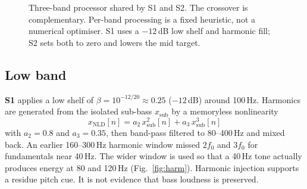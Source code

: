 \documentclass[12pt,journal,onecolumn]{IEEEtran}
\begin{document}
\begin{figure}[!htbp]
\centering
{}
\caption{Three-band processor shared by S1 and S2. The crossover is complementary. Per-band processing is a fixed heuristic, not a numerical optimiser. S1 uses a $-12$\,dB low shelf and harmonic fill; S2 sets both to zero and lowers the mid target.}
\label{fig:block}
\end{figure}

\subsection{Low band}

\textbf{S1} applies a low shelf of $\beta = 10^{-12/20} \approx 0.25$ ($-12$\,dB) around 100\,Hz. Harmonics are generated from the isolated sub-bass $x_{\mathrm{sub}}$ by a memoryless nonlinearity
\begin{equation}
x_{\mathrm{NLD}}[n] = a_2\, x_{\mathrm{sub}}^2[n] + a_3\, x_{\mathrm{sub}}^3[n]
\end{equation}
with $a_2=0.8$ and $a_3=0.35$, then band-pass filtered to 80--400\,Hz and mixed back. An earlier 160--300\,Hz harmonic window missed $2f_0$ and $3f_0$ for fundamentals near 40\,Hz. The wider window is used so that a 40\,Hz tone actually produces energy at 80 and 120\,Hz (Fig.~\ref{fig:harm}). Harmonic injection supports a residue pitch cue. It is not evidence that bass loudness is preserved.
\end{document}
